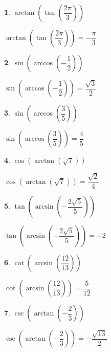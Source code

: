 \documentclass{amsbook}
\newtheorem{exc}{}
\newenvironment{ex}{\begin{exc}\normalfont}{\end{exc}}
\numberwithin{section}{chapter}
\numberwithin{equation}{chapter}
\begin{document}
\begin{multicols}{2}
\begin{ex}
	$\arctan\left(\tan\left(\dfrac{2\pi}{3}\right) \right)$
	\begin{sol}
		$\arctan\left(\tan\left(\dfrac{2\pi}{3}\right) \right) = -\dfrac{\pi}{3}$
	\end{sol}
\end{ex}

\begin{ex}
	 $\sin\left(\arccos\left(-\dfrac{1}{2}\right)\right)$
	\begin{sol}
		 $\sin\left(\arccos\left(-\dfrac{1}{2}\right)\right) = \dfrac{\sqrt{3}}{2}$
	\end{sol}
\end{ex}


\begin{ex}
	$\sin\left(\arccos\left(\dfrac{3}{5}\right)\right) $
	\begin{sol}
		$\sin\left(\arccos\left(\dfrac{3}{5}\right)\right) = \dfrac{4}{5}$
	\end{sol}
\end{ex}


\begin{ex}
	 $\cos\left(\arctan\left(\sqrt{7} \right)\right)$
	\begin{sol}
		 $\cos\left(\arctan\left(\sqrt{7} \right)\right) = \dfrac{\sqrt{2}}{4}$
	\end{sol}
\end{ex}

\begin{ex}
	  $\tan\left(\arcsin\left(-\dfrac{2\sqrt{5}}{5}\right)\right)$
	\begin{sol}
		  $\tan\left(\arcsin\left(-\dfrac{2\sqrt{5}}{5}\right)\right)=-2$
	\end{sol}
\end{ex}


\begin{ex}
	 $\cot\left(\arcsin\left(\dfrac{12}{13}\right)\right)$
	\begin{sol}
		 $\cot\left(\arcsin\left(\dfrac{12}{13}\right)\right) = \dfrac{5}{12}$
	\end{sol}
\end{ex}


\begin{ex}
	  $\csc\left(\arctan\left(-\dfrac{2}{3}\right)\right)$
	
	\begin{sol}
		  $\csc\left(\arctan\left(-\dfrac{2}{3}\right)\right) = -\dfrac{\sqrt{13}}{2}$
		
	\end{sol}
\end{ex}

 \end{multicols}
\end{document}
